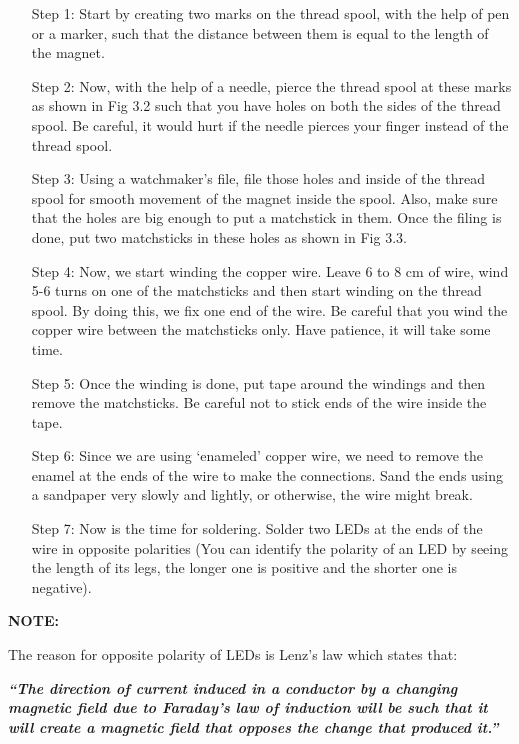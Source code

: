 \begin{itemize}
    \item[Step 1:] Start by creating two marks on the thread spool, with the help of pen
        or a marker, such that the distance between them is equal to the length
        of the magnet.
    \item[Step 2:] Now, with the help of a needle, pierce the thread spool at these marks
        as shown in Fig 3.2 such that you have holes on both the sides of the
        thread spool. Be careful, it would hurt if the needle pierces your finger
        instead of the thread spool.
    \item[Step 3:] Using a watchmaker’s file, file those holes and inside of the thread
        spool for smooth movement of the magnet inside the spool. Also, make
        sure that the holes are big enough to put a matchstick in them. Once
        the filing is done, put two matchsticks in these holes as shown in Fig
        3.3.
    \item[Step 4:] Now, we start winding the copper wire. Leave 6 to 8 cm of wire, wind
        5-6 turns on one of the matchsticks and then start winding on the thread
        spool. By doing this, we fix one end of the wire. Be careful that you
        wind the copper wire between the matchsticks only. Have patience, it
        will take some time.
    \item[Step 5:] Once the winding is done, put tape around the windings and then
        remove the matchsticks. Be careful not to stick ends of the wire inside
        the tape. 
    \item[Step 6:] Since we are using ‘enameled’ copper wire, we need to remove the
        enamel at the ends of the wire to make the connections. Sand the ends
        using a sandpaper very slowly and lightly, or otherwise, the wire might
        break.
    \item[Step 7:] Now is the time for soldering. Solder two LEDs at the ends of the
        wire in opposite polarities (You can identify the polarity of an LED by
        seeing the length of its legs, the longer one is positive and the shorter
        one is negative). 
\end{itemize}
\textbf{NOTE:} 

The reason for opposite polarity of LEDs is Lenz’s law which states
that:

\textbf{\emph{“The direction of current induced in a conductor by a changing
magnetic field due to Faraday’s law of induction will be such that
it will create a magnetic field that opposes the change that produced it.”}}

